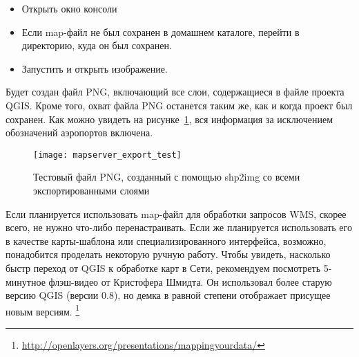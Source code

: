 \begin{itemize}[label=--]
\item Открыть окно консоли
\item Если map-файл не был сохранен в домашнем каталоге, перейти в
директорию, куда он был сохранен.
\item Запустить 
и открыть изображение.
\end{itemize}

Будет создан файл PNG, включающий все слои, содержащиеся в файле проекта
QGIS. Кроме того, охват файла PNG останется таким же, как и когда
проект был сохранен. Как можно увидеть на
рисунке~\ref{fig:mapserver_export_test}, вся информация за исключением
обозначений аэропортов включена.

\begin{figure}[ht]
\centering
  \texttt{[image: mapserver\_export\_test]}
  \caption{Тестовый файл PNG, созданный с помощью shp2img со всеми экспортированными слоями \nixcaption}
  \label{fig:mapserver_export_test}
\end{figure}

Если планируется использовать map-файл для обработки запросов WMS,
скорее всего, не нужно что-либо перенастраивать. Если же планируется
использовать его в качестве карты-шаблона или специализированного
интерфейса, возможно, понадобится проделать некоторую ручную работу.
Чтобы увидеть, насколько быстр переход от QGIS к обработке карт в Сети,
рекомендуем посмотреть 5-минутное флэш-видео от Кристофера Шмидта. Он
использовал более старую версию QGIS (версии 0.8), но демка в равной
степени отображает присущее новым версиям.
\footnote{\url{http://openlayers.org/presentations/mappingyourdata/}}

\FloatBarrier
